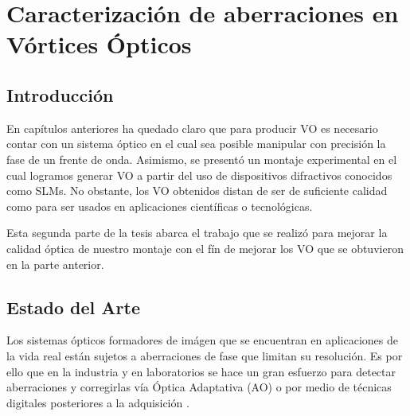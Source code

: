 

\chapter{Caracterización de aberraciones en Vórtices Ópticos}
\label{cha:Car_intro}
\graphicspath{{Figures/chPD_img/}{../Figures/chPD_img/}}
\section{Introducción}
En capítulos anteriores ha quedado claro que para producir VO es
necesario contar con un sistema óptico en el cual sea posible
manipular con precisión la fase de un frente de onda.  Asimismo, se
presentó un montaje experimental en el cual logramos generar VO a
partir del uso de dispositivos difractivos conocidos como SLMs. 
No obstante, los VO obtenidos distan de ser de suficiente calidad como
para ser usados en aplicaciones científicas o tecnológicas. 

Esta segunda parte de la tesis abarca el trabajo que se realizó para
mejorar la calidad óptica de nuestro montaje con el fín de mejorar los
VO que se obtuvieron en la parte anterior. 

\section{Estado del Arte}
\label{sec:ChPD_estado_del_arte}

Los sistemas ópticos formadores de imágen que se encuentran en
aplicaciones de la vida real están sujetos a aberraciones de fase que
limitan su resolución. Es por ello que en la industria y en laboratorios se hace un gran esfuerzo para
detectar aberraciones y corregirlas vía Óptica Adaptativa (AO)  o por
medio de técnicas digitales posteriores a la adquisición
. 

